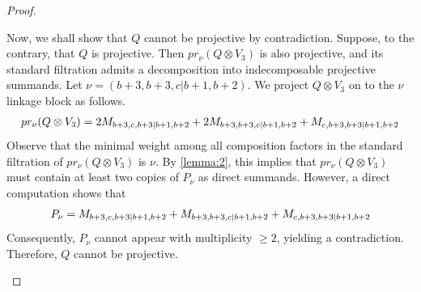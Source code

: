 \begin{proof}
\begin{enumerate}
\begin{enumerate}
\begin{enumerate}
Now, we shall show that $Q$ cannot be projective by contradiction.
Suppose, to the contrary, that $Q$ is projective. Then $pr_\nu(Q \otimes V_3)$ is also projective, and its standard filtration admits a decomposition into indecomposable projective summands.
Let $\nu = (b+3,b+3,c|b+1,b+2)$. We project $Q \otimes V_3$ on to the $\nu$ linkage block as follows.
\begin{equation}\notag
  \begin{aligned}
    pr_\nu(Q \otimes V_3) = 2M_{b+3,c,b+3|b+1,b+2} + 2M_{b+3,b+3,c|b+1,b+2} + M_{c,b+3,b+3|b+1,b+2}
  \end{aligned}
\end{equation}
Observe that the minimal weight among all composition factors in the standard filtration of $pr_\nu(Q \otimes V_3)$ is $\nu$. By \cref{lemma:2}, this implies that $pr_\nu(Q \otimes V_3)$ must contain at least two copies of $P_\nu$ as direct summands. However, a direct computation shows that
  \begin{equation}\notag
    \begin{aligned}
  P_\nu = M_{b+3,c,b+3|b+1,b+2} + M_{b+3,b+3,c|b+1,b+2} + M_{c,b+3,b+3|b+1,b+2}
    \end{aligned}
  \end{equation}
Consequently, $P_\nu$ cannot appear with multiplicity $\geq 2$, yielding a contradiction. Therefore, $Q$ cannot be projective.


\end{enumerate}
\end{enumerate}
\end{enumerate}
\end{proof}
